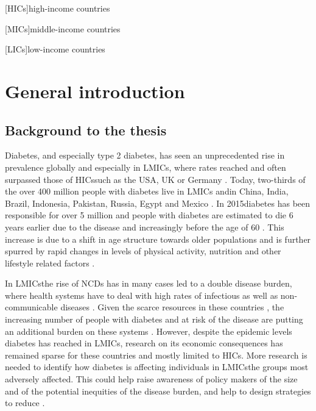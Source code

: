 [HICs]{high-income countries}

[MICs]{middle-income countries}

[LICs]{low-income countries} 
\acresetall  %



\chapter{\label{cha:intro}General introduction}
 \newpage 
\section{Background to the thesis}

Diabetes, and especially type 2 diabetes, has seen an unprecedented rise in prevalence globally and especially in \acp{LMIC}, where rates reached and often surpassed those of \acp{HIC}\DIFaddbegin \DIFadd{, }\DIFaddend such as the USA, UK or Germany \parencite{Risk2016,Hu2011}. Today, two-thirds of the over 400 million people with diabetes live in \acp{LMIC} \parencite{InternationalDiabetesFederation2013} and\DIFdelbegin {}\DIFdelend \DIFaddbegin {}\DIFaddend in China, India, Brazil, Indonesia, Pakistan, Russia, Egypt and Mexico \parencite{Risk2016}. In 2015\DIFaddbegin \DIFadd{, }\DIFaddend diabetes has been responsible for over 5 million \DIFdelbegin {}\DIFdelend \DIFaddbegin {}\DIFaddend and people with diabetes are estimated to die 6 years earlier due to the disease and increasingly before the age of 60 \parencite{InternationalDiabetesFederation2015,Seshasai2011}. This increase \DIFaddbegin {}\DIFaddend is due to a shift in age structure towards older populations and is further spurred by rapid changes in levels of physical activity, nutrition and other lifestyle related factors \parencite{Risk2016,Hu2011}.

In \acp{LMIC}\DIFaddbegin \DIFadd{, }\DIFaddend the rise of \acp{NCD} has in many cases led to a double disease burden, where health systems have to deal with high rates of infectious as well as non-communicable diseases \parencite{Jamison2013}. Given the scarce resources in these countries \parencite{Mills2014}, the increasing number of people with diabetes and at risk of the disease are putting an additional burden on these systems \parencite{Wareham2016,Chan2016}. However, despite the epidemic levels diabetes has reached in \acp{LMIC}, research on its economic consequences has remained sparse for these countries and mostly limited to \acp{HIC}. More research is needed to identify how diabetes is affecting individuals in \acp{LMIC}\DIFdelbegin {}\DIFdelend \DIFaddbegin {}\DIFaddend the groups most adversely affected. This could help raise awareness of policy makers of the size and of the potential inequities of the disease burden, and help to design strategies to reduce \DIFdelbegin {}\DIFdelend \DIFaddbegin {}\DIFaddend .

